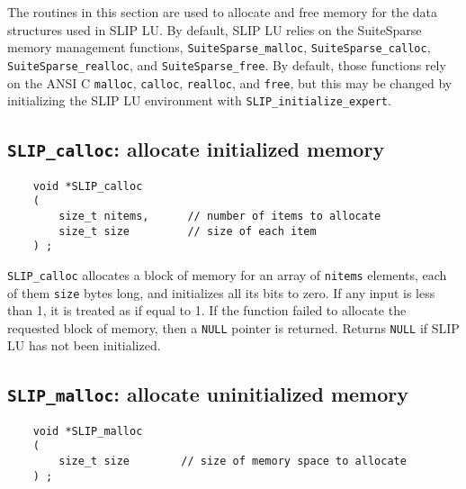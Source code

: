\documentclass[12pt]{article}
\theoremstyle{definition}
\begin{document}
The routines in this section are used to allocate and free memory for the data
structures used in SLIP LU.  By default, SLIP LU relies on the SuiteSparse
memory management functions, \verb|SuiteSparse_malloc|,
\verb|SuiteSparse_calloc|, \verb|SuiteSparse_realloc|, and
\verb|SuiteSparse_free|.  By default, those functions rely on the ANSI C
\verb|malloc|, \verb|calloc|, \verb|realloc|, and \verb|free|, but this may be
changed by initializing the SLIP LU environment with
\verb|SLIP_initialize_expert|.

\newpage
\cprotect\subsection{\verb|SLIP_calloc|: allocate initialized memory}
\label{ss:SLIP_calloc}

\begin{mdframed}[userdefinedwidth=6in]
{\footnotesize
\begin{verbatim}
    void *SLIP_calloc 
    ( 
        size_t nitems,      // number of items to allocate 
        size_t size         // size of each item 
    ) ;
\end{verbatim}
} \end{mdframed}

\verb|SLIP_calloc| allocates a block of memory for an array of \verb|nitems|
elements, each of them \verb|size| bytes long, and initializes all its bits to
zero. If any input is less than 1, it is treated as if equal to 1. If the
function failed to allocate the requested block of memory, then a \verb|NULL|
pointer is returned.
Returns \verb|NULL| if SLIP LU has not been initialized.

\cprotect\subsection{\verb|SLIP_malloc|: allocate uninitialized memory}
\label{ss:SLIP_malloc}

\begin{mdframed}[userdefinedwidth=6in]
{\footnotesize
\begin{verbatim}
    void *SLIP_malloc
    (
        size_t size        // size of memory space to allocate
    ) ;
\end{verbatim}
} \end{mdframed}
\end{document}
